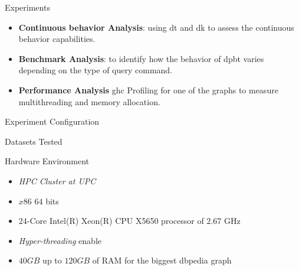 \begin{frame}[fragile]{Experiments}
    \begin{itemize}
      \setlength\itemsep{2em}
      \item \textbf{Continuous behavior Analysis}: using \acrshort{dt} and \acrshort{dk} to assess the continuous behavior capabilities.
      \item \textbf{Benchmark Analysis}: to identify how the behavior of \acrshort{dpbt} varies depending on the type of query command.
      \item \textbf{Performance Analysis} \acrfull{ghc} Profiling for one of the graphs to measure multithreading and memory allocation. 
    \end{itemize}
\end{frame}

\begin{frame}[fragile]{Experiment Configuration}
  \begin{block}{Datasets Tested}
    \begin{table}[H]
      \centering
     \end{table}
  \end{block}
  \begin{block}{Hardware Environment}
    \begin{itemize}
          \item \emph{HPC Cluster at UPC}
          \item $x86$ $64$ bits
          \item $24$-Core Intel(R) Xeon(R) CPU X5650 processor of $2.67$ GHz
          \item \emph{Hyper-threading} enable
          \item $40 GB$ up to $120 GB$ of RAM for the biggest \acrfull{dbpedia} graph
      \end{itemize}        
  \end{block}
\end{frame}

